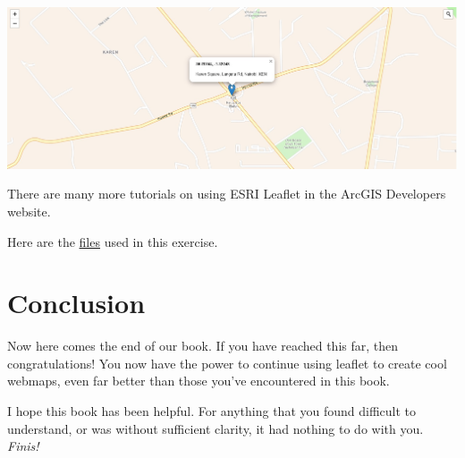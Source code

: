 \documentclass[
]{book}
\begin{document}
\includegraphics[width=26.15in]{../images/search_success}

There are many more tutorials on using ESRI Leaflet in the ArcGIS Developers website.

Here are the \href{https://www.dropbox.com/scl/fo/v5mqzkvpzz8um39c1810g/h?dl=0\&rlkey=2aptw30lln6s3hqxlay9al0y9}{files} used in this exercise.

\hypertarget{conclusion}{%
\chapter{Conclusion}\label{conclusion}}

Now here comes the end of our book. If you have reached this far, then congratulations! You now have the power to continue using leaflet to create cool webmaps, even far better than those you've encountered in this book.

I hope this book has been helpful. For anything that you found difficult to understand, or was without sufficient clarity, it had nothing to do with you.
\emph{Finis!}

  
\end{document}
